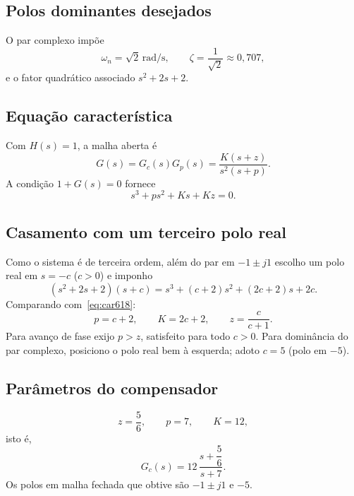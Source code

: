 \documentclass[11pt,a4paper]{article}
\begin{document}
\subsection*{Polos dominantes desejados}

O par complexo impõe
\begin{equation}
  \omega_n=\sqrt{2}\,\mathrm{rad/s},\qquad
  \zeta=\frac{1}{\sqrt{2}}\approx 0{,}707,
\end{equation}
e o fator quadrático associado $s^2+2s+2$.

\subsection*{Equação característica}

Com $H(s)=1$, a malha aberta é
\begin{equation}
  G(s)=G_c(s)G_p(s)=\frac{K(s+z)}{s^2(s+p)}.
\end{equation}
A condição $1+G(s)=0$ fornece
\begin{equation}
  s^3+ps^2+Ks+Kz=0.
  \label{eq:car618}
\end{equation}

\subsection*{Casamento com um terceiro polo real}

Como o sistema é de terceira ordem, além do par em $-1\pm j1$ escolho um polo real em $s=-c$ ($c>0$) e imponho
\begin{equation}
  (s^2+2s+2)(s+c)=s^3+(c+2)s^2+(2c+2)s+2c.
\end{equation}
Comparando com~\eqref{eq:car618}:
\begin{equation}
  p=c+2,\qquad K=2c+2,\qquad z=\frac{c}{c+1}.
\end{equation}
Para avanço de fase exijo $p>z$, satisfeito para todo $c>0$. Para dominância do par complexo, posiciono o polo real bem à esquerda; adoto $c=5$ (polo em $-5$).

\subsection*{Parâmetros do compensador}

\begin{equation}
  \boxed{z=\frac{5}{6},\qquad p=7,\qquad K=12,}
\end{equation}
isto é,
\begin{equation}
  G_c(s)=12\,\frac{s+\dfrac{5}{6}}{s+7}.
\end{equation}
Os polos em malha fechada que obtive são $-1\pm j1$ e $-5$.
\end{document}
